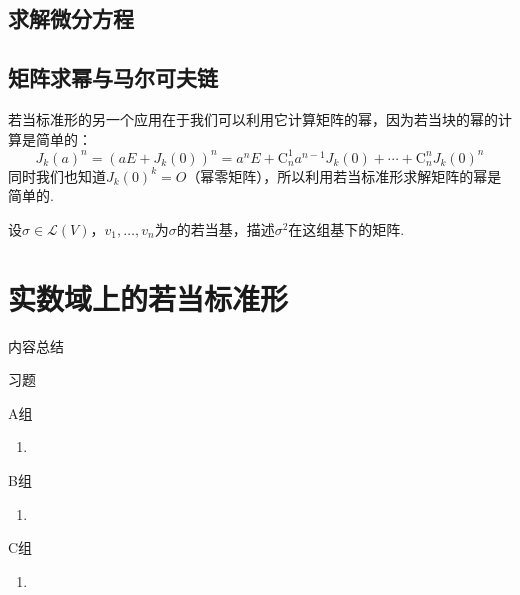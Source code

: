 \subsection{求解微分方程}


\subsection{矩阵求幂与马尔可夫链}
若当标准形的另一个应用在于我们可以利用它计算矩阵的幂，因为若当块的幂的计算是简单的：
\[J_k(a)^n=(aE+J_k(0))^n=a^nE+\mathrm{C}_n^1a^{n-1}J_k(0)+\cdots+\mathrm{C}_n^nJ_k(0)^n\]
同时我们也知道$J_k(0)^k=O$（幂零矩阵），所以利用若当标准形求解矩阵的幂是简单的.
\begin{example}
    设$\sigma\in \mathcal{L}(V)$，$v_1,\ldots,v_n$为$\sigma$的若当基，描述$\sigma^2$在这组基下的矩阵.
\end{example}

\begin{solution}

\end{solution}

\section{实数域上的若当标准形} \label{sec:18:实数域上的若当标准形}

\vspace{2ex}
\centerline{\heiti \Large 内容总结}

\vspace{2ex}
\centerline{\heiti \Large 习题}

\vspace{2ex}
{\kaishu }
\begin{flushright}
    \kaishu

\end{flushright}

\centerline{\heiti A组}
\begin{enumerate}
    \item
\end{enumerate}

\centerline{\heiti B组}
\begin{enumerate}
    \item
\end{enumerate}

\centerline{\heiti C组}
\begin{enumerate}
    \item
\end{enumerate}
